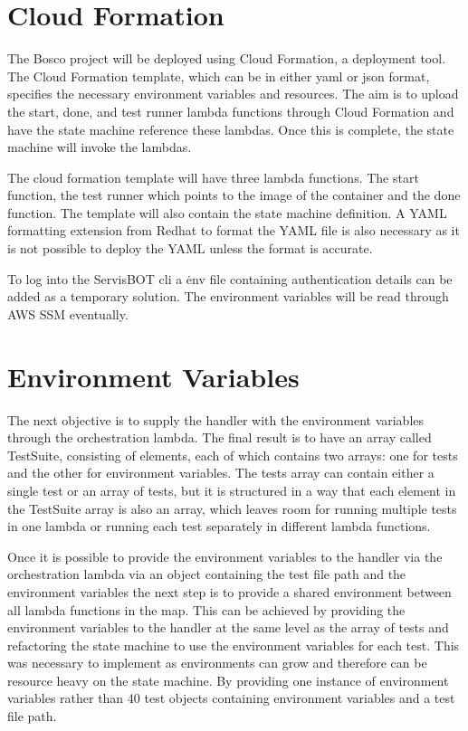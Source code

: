 \documentclass[12pt,a4paper,titlepage]{report}
\begin{document}
\section{Cloud Formation}
The Bosco project will be deployed using Cloud Formation, a deployment tool.
The Cloud Formation template, which can be in either yaml or json format, specifies the necessary environment variables and resources.
The aim is to upload the start, done, and test runner lambda functions through Cloud Formation and have the state machine reference these lambdas.
Once this is complete, the state machine will invoke the lambdas.

The cloud formation template will have three lambda functions.
The start function, the test runner which points to the image of the container and the done function. The
template will also contain the state machine definition. A YAML formatting extension from Redhat to format the YAML
file is also necessary as it is not possible to deploy the YAML unless the format is accurate.

To log into the ServisBOT cli a \.env file containing authentication details can be added as a temporary solution.
The environment variables will be read through AWS SSM eventually.

\section{Environment Variables}
The next objective is to supply the handler with the environment variables through the orchestration lambda.
The final result is to have an array called TestSuite, consisting of elements, each of which contains two arrays: one for tests and the other for environment variables.
The tests array can contain either a single test or an array of tests, but it is structured in a way that each element in the TestSuite array is also an array,
which leaves room for running multiple tests in one lambda or running each test separately in different lambda functions.

Once it is possible to provide the environment variables to the handler via the orchestration lambda via an
object containing the test file path and the environment variables the next step is to provide a shared environment
between all lambda functions in the map. This can be achieved by providing the environment variables to the handler
at the same level as the array of tests and refactoring the state machine to use the environment variables for
each test. This was necessary to implement as environments can grow and therefore can be resource heavy on the
state machine. By providing one instance of environment variables rather than 40 test objects containing
environment variables and a test file path.
\end{document}
